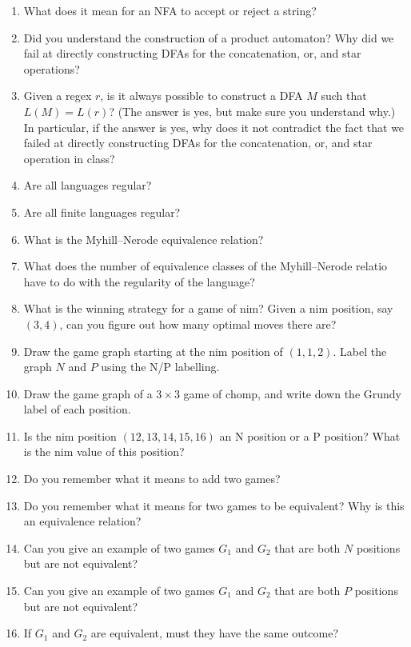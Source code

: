 \documentclass{amsart}
\begin{document}
\begin{enumerate}
\item What does it mean for an NFA to accept or reject a string?
\item Did you understand the construction of a product automaton? Why did we fail at directly constructing DFAs for the concatenation, or, and star operations?
\item Given a regex \(r\), is it always possible to construct a DFA \(M\) such that \(L(M) = L(r)\)? (The answer is yes, but make sure you understand why.) In particular, if the answer is yes, why does it not contradict the fact that we failed at directly constructing DFAs for the concatenation, or, and star operation in class?
\item Are all languages regular?
\item Are all finite languages regular?
\item What is the Myhill--Nerode equivalence relation?
\item What does the number of equivalence classes of the Myhill--Nerode relatio have to do with the regularity of the language?
\item What is the winning strategy for a game of nim? Given a nim position, say \((3,4)\), can you figure out how many optimal moves there are?
\item Draw the game graph starting at the nim position of \((1,1,2)\). Label the graph \(N\) and \(P\) using the N/P labelling.
\item Draw the game graph of a \(3 \times 3\) game of chomp, and write down the Grundy label of each position.
\item Is the nim position \((12,13,14,15,16)\) an N position or a P position? What is the nim value of this position?
\item Do you remember what it means to add two games?
\item Do you remember what it means for two games to be equivalent? Why is this an equivalence relation?
\item Can you give an example of two games \(G_1\) and \(G_2\) that are both \(N\) positions but are not equivalent?
\item Can you give an example of two games \(G_1\) and \(G_2\) that are both \(P\) positions but are not equivalent?
\item If \(G_1\) and \(G_2\) are equivalent, must they have the same outcome?
\end{enumerate}
\end{document}
